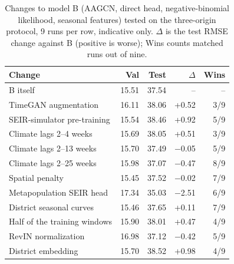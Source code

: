 \begin{table}[t]
\centering
\caption{Changes to model B (AAGCN, direct head, negative-binomial likelihood, seasonal features) tested on the three-origin protocol, 9 runs per row, indicative only. $\Delta$ is the test RMSE change against B (positive is worse); Wins counts matched runs out of nine.}
\label{tab:neg}
\footnotesize
\setlength{\tabcolsep}{3pt}
\begin{tabular}{@{}lrrrr@{}}
\toprule
Change & Val & Test & $\Delta$ & Wins \\
\midrule
B itself & 15.51 & 37.54 & -- & -- \\ %
TimeGAN augmentation & 16.11 & 38.06 & +0.52 & 3/9 \\ %
SEIR-simulator pre-training & 15.54 & 38.46 & +0.92 & 5/9 \\ %
Climate lags 2--4 weeks & 15.69 & 38.05 & +0.51 & 3/9 \\ %
Climate lags 2--13 weeks & 15.70 & 37.49 & $-$0.05 & 5/9 \\ %
Climate lags 2--25 weeks & 15.98 & 37.07 & $-$0.47 & 8/9 \\ %
Spatial penalty & 15.45 & 37.52 & $-$0.02 & 7/9 \\ %
Metapopulation SEIR head & 17.34 & 35.03 & $-$2.51 & 6/9 \\ %
District seasonal curves & 15.46 & 37.65 & +0.11 & 7/9 \\ %
Half of the training windows & 15.90 & 38.01 & +0.47 & 4/9 \\ %
RevIN normalization & 16.98 & 37.12 & $-$0.42 & 5/9 \\ %
District embedding & 15.70 & 38.52 & +0.98 & 4/9 \\ %
\bottomrule
\end{tabular}
\end{table}
